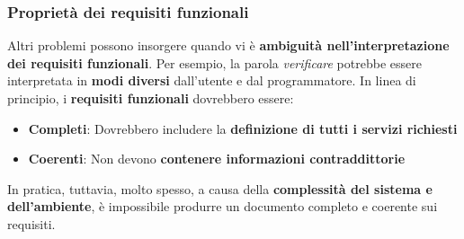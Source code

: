 \documentclass[12pt]{article}
\begin{document}
\subsubsection{Proprietà dei requisiti funzionali}
Altri problemi possono insorgere quando vi è \textbf{ambiguità nell'interpretazione dei requisiti funzionali}. Per esempio, la parola \textit{verificare} potrebbe essere interpretata in \textbf{modi diversi} dall'utente e dal programmatore.
In linea di principio, i \textbf{requisiti funzionali} dovrebbero essere:
\begin{itemize}
    \item \textbf{Completi}: Dovrebbero includere la \textbf{definizione di tutti i servizi richiesti}
    \item \textbf{Coerenti}: Non devono \textbf{contenere informazioni contraddittorie}
\end{itemize}
In pratica, tuttavia, molto spesso, a causa della \textbf{complessità del sistema e dell'ambiente}, è impossibile produrre un documento completo e coerente sui requisiti.
\end{document}
